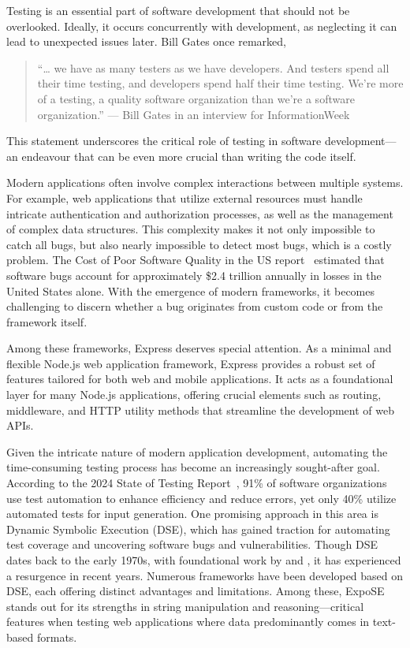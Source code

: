 \setcounter{page}{1}

Testing is an essential part of software development that should not be overlooked. Ideally, it occurs concurrently with development, as neglecting it can lead to unexpected issues later. Bill Gates once remarked, 
\begin{quote}

    “… we have as many testers as we have developers. And testers spend all their time testing, and developers spend half their time testing. We're more of a testing, a quality software organization than we're a software organization.” — Bill Gates in an interview for InformationWeek \cite{bill_q_2002} 
\end{quote}

This statement underscores the critical role of testing in software development—an endeavour that can be even more crucial than writing the code itself. 

Modern applications often involve complex interactions between multiple systems. For example, web applications that utilize external resources must handle intricate authentication and authorization processes, as well as the management of complex data structures. This complexity makes it not only impossible to catch all bugs, but also nearly impossible to detect most bugs, which is a costly problem. The Cost of Poor Software Quality in the US report~\cite{herb_krasner_cost_2022} estimated that software bugs account for approximately \$2.4 trillion annually in losses in the United States alone. 
With the emergence of modern frameworks, it becomes challenging to discern whether a bug originates from custom code or from the framework itself.

Among these frameworks, Express deserves special attention. As a minimal and flexible Node.js web application framework, Express provides a robust set of features tailored for both web and mobile applications. It acts as a foundational layer for many Node.js applications, offering crucial elements such as routing, middleware, and HTTP utility methods that streamline the development of web APIs.

Given the intricate nature of modern application development, automating the time-consuming testing process has become an increasingly sought-after goal.
According to the 2024 State of Testing Report~\cite{joel_montvelliksy_state_2024}, 91\% of software organizations use test automation to enhance efficiency and reduce errors, yet only 40\% utilize automated tests for input generation.
One promising approach in this area is Dynamic Symbolic Execution (DSE), which has gained traction for automating test coverage and uncovering software bugs and vulnerabilities. Though DSE dates back to the early 1970s, with foundational work by \citet{boyer_selectformal_1975} and  \citet{king_new_1975}, it has experienced a resurgence in recent years. Numerous frameworks have been developed based on DSE, each offering distinct advantages and limitations. Among these, ExpoSE \citet{loring_expose_2017} stands out for its strengths in string manipulation and reasoning—critical features when testing web applications where data predominantly comes in text-based formats.

